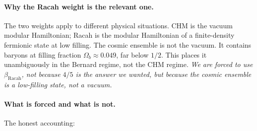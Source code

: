 \documentclass[11pt,letterpaper]{article}
\begin{document}
\paragraph{Why the Racah weight is the relevant one.}
The two weights apply to different physical situations. CHM is the
vacuum modular Hamiltonian; Racah is the modular Hamiltonian of a
finite-density fermionic state at low filling. The cosmic ensemble
is not the vacuum. It contains baryons at filling fraction
$\Omega_b \approx 0.049$, far below $1/2$. This places it
unambiguously in the Bernard regime, not the CHM regime. \emph{We
are forced to use $\beta_{\mathrm{Racah}}$, not because $4/5$ is
the answer we wanted, but because the cosmic ensemble is a
low-filling state, not a vacuum.}

\paragraph{What is forced and what is not.}
The honest accounting:
\end{document}
